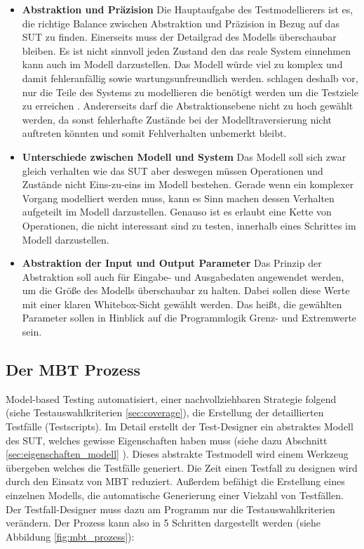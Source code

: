 \begin{itemize}
\item \textbf{Abstraktion und Präzision} Die Hauptaufgabe des Testmodellierers ist es, die richtige Balance zwischen Abstraktion und Präzision in Bezug auf das \gls{SUT} zu finden\cite{utting_practical_2007}. Einerseits muss der Detailgrad des Modells überschaubar bleiben. Es ist nicht sinnvoll jeden Zustand den das reale System einnehmen kann auch im Modell darzustellen. Das Modell würde viel zu komplex und damit fehleranfällig sowie wartungsunfreundlich werden. \citeauthor{utting_practical_2007} schlagen deshalb vor, nur die Teile des Systems zu modellieren die benötigt werden um die Testziele zu erreichen \cite{utting_practical_2007}. Andererseits darf die Abstraktionsebene nicht zu hoch gewählt werden, da sonst fehlerhafte Zustände bei der Modelltraversierung nicht auftreten könnten und somit Fehlverhalten unbemerkt bleibt. 
\item \textbf{Unterschiede zwischen Modell und System} Das Modell soll sich zwar gleich verhalten wie das \gls{SUT} aber deswegen müssen Operationen und Zustände nicht Eins-zu-eins im Modell bestehen. Gerade wenn ein komplexer Vorgang modelliert werden muss, kann es Sinn machen dessen Verhalten aufgeteilt im Modell darzustellen. Genauso ist es erlaubt eine Kette von Operationen, die nicht interessant sind zu testen, innerhalb eines Schrittes im Modell darzustellen.
\item \textbf{Abstraktion der Input und Output Parameter} Das Prinzip der Abstraktion soll auch für Eingabe- und Ausgabedaten angewendet werden, um die Größe des Modells überschaubar zu halten. Dabei sollen diese Werte mit einer klaren Whitebox-Sicht gewählt werden. Das heißt, die gewählten Parameter sollen in Hinblick auf die Programmlogik Grenz- und Extremwerte sein.     
\end{itemize}

\subsection{Der \Gls{MBT} Prozess}
Model-based Testing automatisiert, einer nachvollziehbaren Strategie folgend (siehe Testauswahlkriterien \ref{sec:coverage}), die Erstellung der detaillierten Testfälle (Testscripts).
Im Detail erstellt der Test-Designer ein abstraktes Modell des SUT, welches gewisse Eigenschaften haben muss (siehe dazu Abschnitt \ref{sec:eigenschaften_modell} ). Dieses abstrakte Testmodell wird einem Werkzeug übergeben welches die Testfälle generiert. Die Zeit einen Testfall zu designen wird durch den Einsatz von \Gls{MBT} reduziert. Außerdem befähigt die Erstellung eines einzelnen Modells, die automatische Generierung einer Vielzahl von Testfällen. Der Testfall-Designer muss dazu am Programm nur die Testauswahlkriterien verändern. \cite{utting_practical_2007} Der Prozess kann also in 5 Schritten dargestellt werden (siehe Abbildung \ref{fig:mbt_prozess}):

